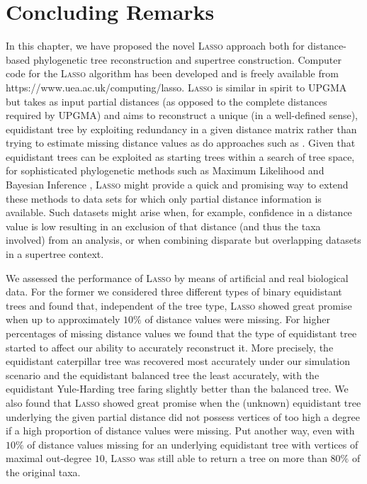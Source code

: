 \section{Concluding Remarks}
\label{sec:conclusion}

In this chapter, we have proposed the novel \textsc{Lasso} approach both for
distance-based phylogenetic tree reconstruction and supertree construction.
Computer code for the \textsc{Lasso} algorithm has been developed and is
freely available from https://www.uea.ac.uk/computing/lasso.  \textsc{Lasso}
is similar in spirit to \textsc{UPGMA} but takes as input partial distances
(as opposed to the complete distances required by \textsc{UPGMA}) and aims to
reconstruct a unique (in a well-defined sense), equidistant tree by exploiting
redundancy in a given distance matrix rather than trying to estimate missing
distance values as do approaches such as \cite{criscuolo2008fastnj}. Given
that equidistant trees can be exploited as starting trees within a search of
tree space, for sophisticated phylogenetic methods such as Maximum Likelihood
and Bayesian Inference \cite{burbrink09molecular,bouckaert14beast},
\textsc{Lasso} might provide a quick and promising way to extend these methods
to data sets for which only partial distance information is available. Such
datasets might arise when, for example, confidence in a distance value is low
resulting in an exclusion of that distance (and thus the taxa involved) from
an analysis, or when combining disparate but overlapping datasets in a
supertree context.

We assessed the performance of \textsc{Lasso} by means of artificial and real
biological data.  For the former we considered three different types of binary
equidistant trees and found that, independent of the tree type, \textsc{Lasso}
showed great promise when up to approximately $10\%$ of distance values were
missing.  For higher percentages of missing distance values we found that the
type of equidistant tree started to affect our ability to accurately
reconstruct it. More precisely, the equidistant caterpillar tree was recovered
most accurately under our simulation scenario and the equidistant balanced
tree the least accurately, with the equidistant Yule-Harding tree faring
slightly better than the balanced tree.  We also found that \textsc{Lasso}
showed great promise when the (unknown) equidistant tree underlying the given
partial distance did not possess vertices of too high a degree if a high
proportion of distance values were missing.  Put another way, even with $10\%$
of distance values missing for an underlying equidistant tree with vertices of
maximal out-degree $10$, \textsc{Lasso} was still able to return a tree on
more than $80\%$ of the original taxa.

